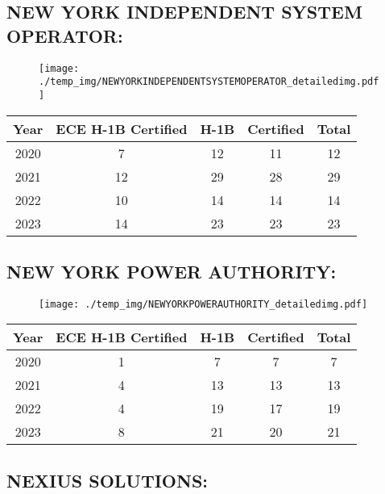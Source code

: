 \documentclass{article}%
\begin{document}
%
\newpage%
\subsection{NEW YORK INDEPENDENT SYSTEM OPERATOR:}%
\label{subsec:NEWYORKINDEPENDENTSYSTEMOPERATOR}%
\label{NEWYORKINDEPENDENTSYSTEMOPERATORdetailed}%


\begin{figure}[htbp]%
\centering%
\texttt{[image: ./temp\_img/NEWYORKINDEPENDENTSYSTEMOPERATOR\_detailedimg.pdf]}%
\end{figure}

%
\begin{longtable}{c|c|c|c|c}%
\hline%
Year&ECE H{-}1B Certified&H{-}1B&Certified&Total\\%
\hline%
2020&7&12&11&12\\%
\hline%
2021&12&29&28&29\\%
\hline%
2022&10&14&14&14\\%
\hline%
2023&14&23&23&23\\%
\hline%
\end{longtable}

%
\newpage%
\subsection{NEW YORK POWER AUTHORITY:}%
\label{subsec:NEWYORKPOWERAUTHORITY}%
\label{NEWYORKPOWERAUTHORITYdetailed}%


\begin{figure}[htbp]%
\centering%
\texttt{[image: ./temp\_img/NEWYORKPOWERAUTHORITY\_detailedimg.pdf]}%
\end{figure}

%
\begin{longtable}{c|c|c|c|c}%
\hline%
Year&ECE H{-}1B Certified&H{-}1B&Certified&Total\\%
\hline%
2020&1&7&7&7\\%
\hline%
2021&4&13&13&13\\%
\hline%
2022&4&19&17&19\\%
\hline%
2023&8&21&20&21\\%
\hline%
\end{longtable}

%
\newpage%
\subsection{NEXIUS SOLUTIONS:}%
\label{subsec:NEXIUSSOLUTIONS}%
\label{NEXIUSSOLUTIONSdetailed}%
\end{document}
